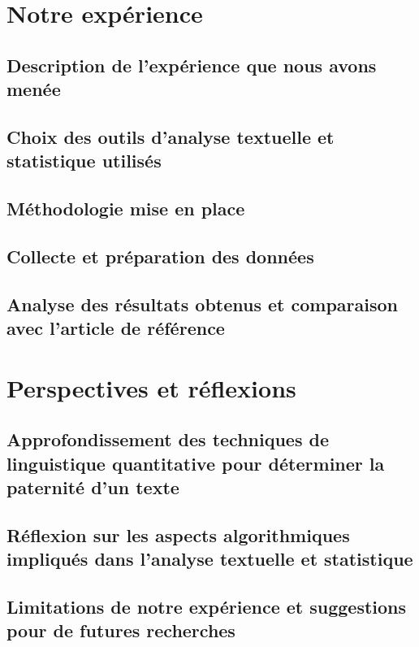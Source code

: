 \documentclass{report} %
\begin{document}
\section{Notre expérience}

\vspace{\baselineskip}
\subsection{Description de l'expérience que nous avons menée}

\subsection{Choix des outils d'analyse textuelle et statistique utilisés}

\subsection{Méthodologie mise en place}

\subsection{Collecte et préparation des données}

\subsection{Analyse des résultats obtenus et comparaison avec l'article de référence}


\section{Perspectives et réflexions}

\subsection{Approfondissement des techniques de linguistique quantitative pour déterminer la paternité d'un texte}
\subsection{Réflexion sur les aspects algorithmiques impliqués dans l'analyse textuelle et statistique}
\subsection{Limitations de notre expérience et suggestions pour de futures recherches}
\end{document}
